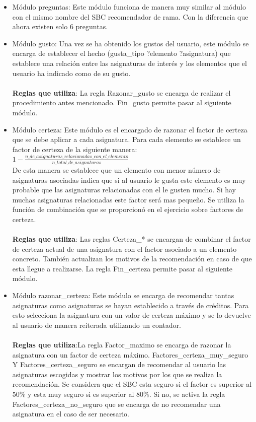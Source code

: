\begin{itemize}
   \item Módulo preguntas: Este módulo funciona de manera muy similar al módulo con el mismo nombre del SBC recomendador de rama. Con la diferencia que ahora existen solo 6 preguntas.

   \item Módulo gusto: Una vez se ha obtenido los gustos del usuario, este módulo se encarga de establecer el hecho (gusta\_tipo ?elemento ?asignatura) que establece una relación entre las asignaturas de interés y los elementos que el usuario ha indicado como de su gusto.
   \\\\
   \textbf{Reglas que utiliza}: La regla Razonar\_gusto se encarga de realizar el procedimiento antes mencionado. Fin\_gusto permite pasar al siguiente módulo.

   \item Módulo certeza: Este módulo es el encargado de razonar el factor de certeza que se debe aplicar a cada asignatura. Para cada elemento se establece un factor de certeza de la siguiente manera: \\$1 - \frac{n\_de\_asignaturas\_relacionadas\_con\_el\_elemento}{n\_total\_de\_asignaturas}$\\ De esta manera se establece que un elemento con menor número de asignaturas asociadas indica que si al usuario le gusta este elemento es muy probable que las asignaturas relacionadas con el le gusten mucho. Si hay muchas asignaturas relacionadas este factor será mas pequeño. Se utiliza la función de combinación que se proporcionó en el ejercicio sobre factores de certeza.
   \\\\
   \textbf{Reglas que utiliza}: Las reglas Certeza\_* se encargan de combinar el factor de certeza actual de una asignatura con el factor asociado a un elemento concreto. También actualizan los motivos de la recomendación en caso de que esta llegue a realizarse. La regla Fin\_certeza permite pasar al siguiente módulo.

   \item Módulo razonar\_certeza: Este módulo se encarga de recomendar tantas asignaturas como asignaturas se hayan establecido a través de créditos. Para esto selecciona la asignatura con un valor de certeza máximo y se lo devuelve al usuario de manera reiterada utilizando un contador.
   \\\\
   \textbf{Reglas que utiliza}:La regla Factor\_maximo se encarga de razonar la asignatura con un factor de certeza máximo. Factores\_certeza\_muy\_seguro Y Factores\_certeza\_seguro se encargan de recomendar al usuario las asignaturas escogidas y mostrar los motivos por los que se realiza la recomendación. Se considera que el SBC esta seguro si el factor es superior al 50\% y esta muy seguro si es superior al 80\%. Si no, se activa la regla Factores\_certeza\_no\_seguro que se encarga de no recomendar una asignatura en el caso de ser necesario.

\end{itemize}


